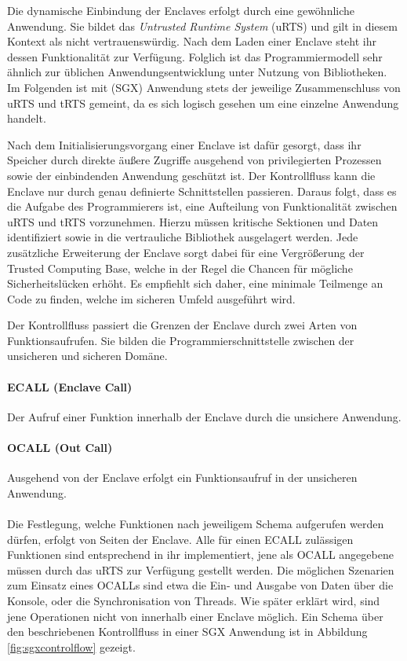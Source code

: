 Die dynamische Einbindung der Enclaves erfolgt durch eine gewöhnliche Anwendung. Sie bildet das \textit{Untrusted Runtime System} (uRTS) und gilt in diesem Kontext als nicht vertrauenswürdig. Nach dem Laden einer Enclave steht ihr dessen Funktionalität zur Verfügung. Folglich ist das Programmiermodell sehr ähnlich zur üblichen Anwendungsentwicklung unter Nutzung von Bibliotheken. Im Folgenden ist mit (SGX) Anwendung stets der jeweilige Zusammenschluss von uRTS und tRTS gemeint, da es sich logisch gesehen um eine einzelne Anwendung handelt.

Nach dem Initialisierungsvorgang einer Enclave ist dafür gesorgt, dass ihr Speicher durch direkte äußere Zugriffe ausgehend von privilegierten Prozessen sowie der einbindenden Anwendung geschützt ist. Der Kontrollfluss kann die Enclave nur durch genau definierte Schnittstellen passieren. Daraus folgt, dass es die Aufgabe des Programmierers ist, eine Aufteilung von Funktionalität zwischen uRTS und tRTS vorzunehmen. Hierzu müssen kritische Sektionen und Daten identifiziert sowie in die vertrauliche Bibliothek ausgelagert werden. Jede zusätzliche Erweiterung der Enclave sorgt dabei für eine Vergrößerung der Trusted Computing Base, welche in der Regel die Chancen für mögliche Sicherheitslücken erhöht. Es empfiehlt sich daher, eine minimale Teilmenge an Code zu finden, welche im sicheren Umfeld ausgeführt wird. 

Der Kontrollfluss passiert die Grenzen der Enclave durch zwei Arten von Funktionsaufrufen. Sie bilden die Programmierschnittstelle zwischen der unsicheren und sicheren Domäne.

\paragraph{ECALL (Enclave Call) } Der Aufruf einer Funktion innerhalb der Enclave durch die unsichere Anwendung.

\paragraph{OCALL (Out Call)} Ausgehend von der Enclave erfolgt ein Funktionsaufruf in der unsicheren Anwendung.

\paragraph{}
Die Festlegung, welche Funktionen nach jeweiligem Schema aufgerufen werden dürfen, erfolgt von Seiten der Enclave. Alle für einen ECALL zulässigen Funktionen sind entsprechend in ihr implementiert, jene als OCALL angegebene müssen durch das uRTS zur Verfügung gestellt werden. Die möglichen Szenarien zum Einsatz eines OCALLs sind etwa die Ein- und Ausgabe von Daten über die Konsole, oder die Synchronisation von Threads. Wie später erklärt wird, sind jene Operationen nicht von innerhalb einer Enclave möglich. Ein Schema über den beschriebenen Kontrollfluss in einer SGX Anwendung ist in Abbildung \ref{fig:sgxcontrolflow} gezeigt.

